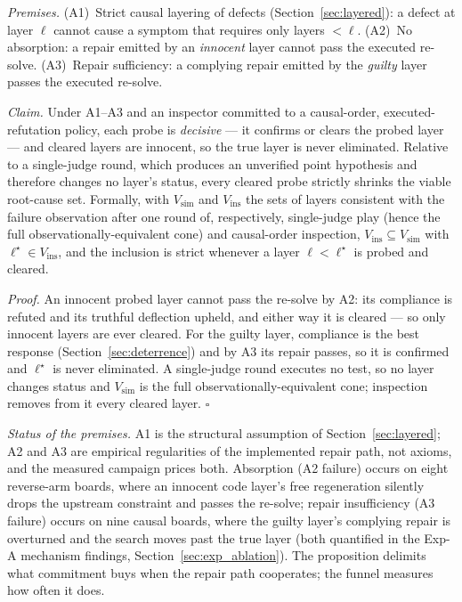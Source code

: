 \documentclass[a4paper,fleqn]{cas-sc}
\begin{document}
\begin{propbox}[title={Proposition 1 (Causal-order inspection lowers mis-attribution)}]
\emph{Premises.}
(A1)~Strict causal layering of defects (Section~\ref{sec:layered}): a defect
at layer $\ell$ cannot cause a symptom that requires only layers ${<}\ell$.
(A2)~No absorption: a repair emitted by an \emph{innocent} layer cannot pass
the executed re-solve.
(A3)~Repair sufficiency: a complying repair emitted by the \emph{guilty}
layer passes the executed re-solve.

\emph{Claim.} Under A1--A3 and an inspector committed to a causal-order,
executed-refutation policy, each probe is \emph{decisive} --- it confirms or
clears the probed layer --- and cleared layers are innocent, so the true
layer is never eliminated. Relative to a single-judge round, which produces
an unverified point hypothesis and therefore changes no layer's status,
every cleared probe strictly shrinks the viable root-cause set. Formally,
with $V_{\text{sim}}$ and $V_{\text{ins}}$ the sets of layers consistent
with the failure observation after one round of, respectively, single-judge
play (hence the full observationally-equivalent cone) and causal-order
inspection, $V_{\text{ins}}\subseteq V_{\text{sim}}$ with
$\ell^{\star}\in V_{\text{ins}}$, and the inclusion is strict whenever a
layer $\ell<\ell^{\star}$ is probed and cleared.
\end{propbox}

\emph{Proof.} An innocent probed layer cannot pass the re-solve by A2: its
compliance is refuted and its truthful deflection upheld, and either way it
is cleared --- so only innocent layers are ever cleared. For the guilty
layer, compliance is the best response (Section~\ref{sec:deterrence}) and
by A3 its repair passes, so it is confirmed and $\ell^{\star}$ is never
eliminated. A single-judge round executes no test, so no layer changes
status and $V_{\text{sim}}$ is the full observationally-equivalent cone;
inspection removes from it every cleared layer. $\square$

\emph{Status of the premises.} A1 is the structural assumption of
Section~\ref{sec:layered}; A2 and A3 are empirical regularities of the
implemented repair path, not axioms, and the measured campaign prices both.
Absorption (A2 failure) occurs on eight reverse-arm boards, where an
innocent code layer's free regeneration silently drops the upstream
constraint and passes the re-solve; repair insufficiency (A3 failure)
occurs on nine causal boards, where the guilty layer's complying repair is
overturned and the search moves past the true layer (both quantified in
the Exp-A mechanism findings, Section~\ref{sec:exp_ablation}).
The proposition delimits what commitment buys when the repair path
cooperates; the funnel measures how often it does.
\end{document}
